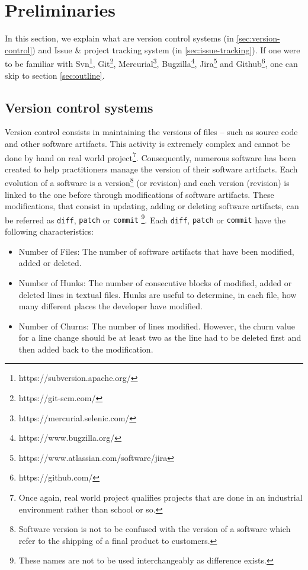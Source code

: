 \section{Preliminaries\label{sec:preliminaries}}


In this section, we explain what are version control systems (in \ref{sec:version-control}) and Issue \& project tracking system (in \ref{sec:issue-tracking}). If one were to be familiar with Svn\footnote{https://subversion.apache.org/}, Git\footnote{https://git-scm.com/}, Mercurial\footnote{https://mercurial.selenic.com/}, Bugzilla\footnote{https://www.bugzilla.org/}, Jira\footnote{https://www.atlassian.com/software/jira} and Github\footnote{https://github.com/}, one can skip to section \ref{sec:outline}.

\subsection{Version control systems\label{sec:version-control}}

Version control consists in maintaining the versions of files -- such as source code and other software artifacts.
This activity is extremely complex and cannot be done by hand on real world project\footnote{Once again, real world project qualifies projects that are done in an industrial environment rather than school or so.}.
Consequently, numerous software has been created to help practitioners manage the version of their software artifacts.
Each evolution of a software is a version\footnote{Software version is not to be confused with the version of a software which refer to the shipping of a final product to customers.} (or revision) and each version (revision) is linked to the one before through modifications of software artifacts.
These modifications, that consist in updating, adding or deleting software artifacts, can be referred as \texttt{diff}, {\tt patch} or {\tt commit}
\footnote{These names are not to be used interchangeably as difference exists.}.
Each \texttt{diff}, {\tt patch} or {\tt commit} have the following characteristics:

\begin{itemize}
\item Number of Files: The number of software artifacts that have been modified, added or deleted.
\item Number of Hunks: The number of consecutive blocks of modified, added or deleted lines in textual files. Hunks are useful to determine, in each file, how many different places the developer have modified.
\item Number of Churns:  The number of lines modified. However, the churn value for a line change should be at least two as the line had to be deleted first and then added back to the modification.
\end{itemize}

